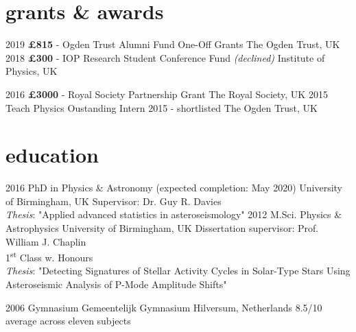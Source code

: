 \documentclass[letterpaper]{k-cv} %
\begin{document}
\section{\color{c4}grants \& awards}

\begin{entrylist}
	\entrythree
	{2019}
	{\textbf{\textcolor{c4}{\pounds 815}} - Ogden Trust Alumni Fund One-Off Grants}
	{The Ogden Trust, UK}
	\entrythree
	{2018}
	{\textbf{\textcolor{c4}{\pounds 300}} - IOP Research Student Conference Fund \emph{(declined)}}
	{Institute of Physics, UK}
	
	\entrythree
	{2016}
	{\textbf{\textcolor{c4}{\pounds 3000}} - Royal Society Partnership Grant}
	{The Royal Society, UK}
	\entrythree
	{2015}
	{Teach Physics Oustanding Intern 2015 - shortlisted}
	{The Ogden Trust, UK}
	
\end{entrylist}



\section{\color{c1}education}

\begin{entrylist}
\centry
{2016 }
{PhD {\normalfont in Physics \& Astronomy (expected completion: May 2020)}}
{University of Birmingham, UK}
{Supervisor: Dr. Guy R. Davies\\
\textit{Thesis}: "Applied advanced statistics in asteroseismology"} 
\centry
{2012 }
{M.Sci. {\normalfont Physics \& Astrophysics}}
{University of Birmingham, UK}
{Dissertation supervisor: Prof. William J. Chaplin\\
1\textsuperscript{st} Class w. Honours\\ \textit{Thesis}: "Detecting Signatures of Stellar Activity Cycles in Solar-Type Stars Using Asteroseismic Analysis of P-Mode Amplitude Shifts"}



\centry
{2006 }
{Gymnasium}
{Gemeentelijk Gymnasium Hilversum, Netherlands}
{8.5/10 average across eleven subjects}
\end{entrylist}
\end{document}
